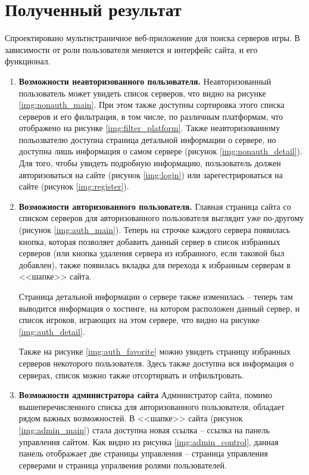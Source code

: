\section{Полученный результат}

Спроектировано мультистраничное веб-приложение для поиска серверов игры. В зависимости от роли пользователя меняется и интерфейс сайта, и его функционал.

\begin{enumerate}
    \item \textbf{Возможности неавторизованного пользователя.} Неавторизованный пользователь может увидеть список серверов, что видно на рисунке \ref{img:nonauth_main}. При этом также доступны сортировка этого списка серверов и его фильтрация, в том числе, по различным платформам, что отображено на рисунке \ref{img:filter_platform}. Также неавторизованному польозвателю доступна страница детальной информации о сервере, но доступна лишь информация о самом сервере (рисунок \ref{img:nonauth_detail}). Для того, чтобы увидеть подробную информацию, пользователь должен авторизоваться на сайте (рисунок \ref{img:login}) или зарегестрироваться на сайте (рисунок \ref{img:register}).
    
    \item \textbf{Возможности авторизованного пользователя.} Главная страница сайта со списком серверов для авторизованного пользователя выглядит уже по-другому (рисунок \ref{img:auth_main}). Теперь на строчке каждого сервера появилась кнопка, которая позволяет добавить данный сервер в список избранных серверов (или кнопка удаления сервера из избранного, если таковой был добавлен), также появилась вкладка для перехода к избранным серверам в <<шапке>> сайта.
    
    Страница детальной информации о сервере также изменилась -- теперь там выводится информация о хостинге, на котором расположен данный сервер, и список игроков, играющих на этом сервере, что видно на рисунке \ref{img:auth_detail}.

    Также на рисунке \ref{img:auth_favorite} можно увидеть страницу избранных серверов некоторого пользователя. Здесь также доступна вся информация о серверах, список можно также отсортирвать и отфильтровать.

    \item \textbf{Возможности администратора сайта} Администратор сайта, помимо вышеперечисленного списка для авторизованного пользователя, обладает рядом важных возможностей. В <<шапке>> сайта (рисунок \ref{img:admin_main}) стала доступна новая ссылка -- ссылка на панель управления сайтом. Как видно из рисунка \ref{img:admin_control}, данная панель отображает две страницы управления -- страница управления серверами и страница упралвения ролями пользователей.
    

\end{enumerate}
